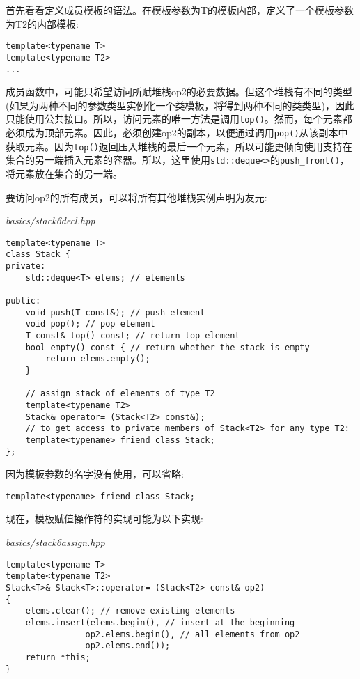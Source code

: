 首先看看定义成员模板的语法。在模板参数为T的模板内部，定义了一个模板参数为T2的内部模板:

\begin{lstlisting}[style=styleCXX]
template<typename T>
template<typename T2>
...
\end{lstlisting}

成员函数中，可能只希望访问所赋堆栈op2的必要数据。但这个堆栈有不同的类型(如果为两种不同的参数类型实例化一个类模板，将得到两种不同的类类型)，因此只能使用公共接口。所以，访问元素的唯一方法是调用\texttt{top()}。然而，每个元素都必须成为顶部元素。因此，必须创建op2的副本，以便通过调用\texttt{pop()}从该副本中获取元素。因为\texttt{top()}返回压入堆栈的最后一个元素，所以可能更倾向使用支持在集合的另一端插入元素的容器。所以，这里使用\texttt{std::deque<>}的\texttt{push\_front()}，将元素放在集合的另一端。

要访问op2的所有成员，可以将所有其他堆栈实例声明为友元:

\noindent
\textit{basics/stack6decl.hpp}
\begin{lstlisting}[style=styleCXX]
template<typename T>
class Stack {
private:
	std::deque<T> elems; // elements
	
public:
	void push(T const&); // push element
	void pop(); // pop element
	T const& top() const; // return top element
	bool empty() const { // return whether the stack is empty
		return elems.empty();
	}

	// assign stack of elements of type T2
	template<typename T2>
	Stack& operator= (Stack<T2> const&);
	// to get access to private members of Stack<T2> for any type T2:
	template<typename> friend class Stack;
};
\end{lstlisting}

因为模板参数的名字没有使用，可以省略:

\begin{lstlisting}[style=styleCXX]
template<typename> friend class Stack;
\end{lstlisting}

现在，模板赋值操作符的实现可能为以下实现:

\noindent
\textit{basics/stack6assign.hpp}
\begin{lstlisting}[style=styleCXX]
template<typename T>
template<typename T2>
Stack<T>& Stack<T>::operator= (Stack<T2> const& op2)
{
	elems.clear(); // remove existing elements
	elems.insert(elems.begin(), // insert at the beginning
				op2.elems.begin(), // all elements from op2
				op2.elems.end());
	return *this;
}
\end{lstlisting}

